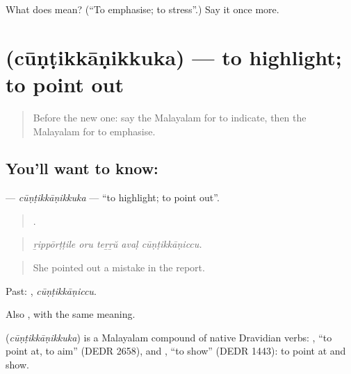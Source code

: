 \begin{tcolorbox}[breakable,colback=teal!4,colframe=teal!35!black,title={Before you move on}]
What does  mean? (\textquotedblleft{}To emphasise; to stress\textquotedblright{}.) Say it once more.
\end{tcolorbox}
\section[\texorpdfstring{\ml{ചൂണ്ടിക്കാണിക്കുക} (cūṇṭikkāṇikkuka)}{ചൂണ്ടിക്കാണിക്കുക (cūṇṭikkāṇikkuka)}]{ (cūṇṭikkāṇikkuka) — to highlight; to point out}

\label{lesson:ML-C410-cuntikkanikkuka}



\begin{quote}
Before the new one: say the Malayalam for to indicate, then the Malayalam for to emphasise.
\end{quote}

\subsection*{You'll want to know: }
\textbf{} — \emph{cūṇṭikkāṇikkuka} — \textquotedblleft{}to highlight; to point out\textquotedblright{}.

\begin{quote}
    .
\end{quote}

\begin{quote}
\emph{ṟippōrṭṭile oru teṟṟŭ avaḷ cūṇṭikkāṇiccu.}
\end{quote}

\begin{quote}
She pointed out a mistake in the report.
\end{quote}

Past: , \emph{cūṇṭikkāṇiccu}.

Also , with the same meaning.

\begin{cousinweb}
\textbf{} (\emph{cūṇṭikkāṇikkuka}) is a Malayalam compound of native Dravidian verbs: , \textquotedblleft{}to point at, to aim\textquotedblright{} (DEDR 2658), and , \textquotedblleft{}to show\textquotedblright{} (DEDR 1443): to point at and show.
\end{cousinweb}

